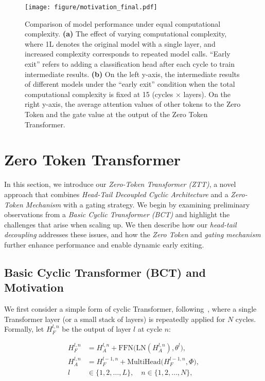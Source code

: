 \begin{figure*}[h]
    \centering
    \texttt{[image: figure/motivation\_final.pdf]}
    \vspace{-0.5cm}
\caption{
Comparison of model performance under equal computational complexity.
\textbf{(a)} The effect of varying computational complexity, where 1L denotes the original model with a single layer, and increased complexity corresponds to repeated model calls.
``Early exit'' refers to adding a classification head after each cycle to train intermediate results.
\textbf{(b)} On the left y-axis, the intermediate results of different models under the ``early exit'' condition when the total computational complexity is fixed at 15 (cycles $\times$ layers).
On the right y-axis, the average attention values of other tokens to the Zero Token and the gate value at the output of the Zero Token Transformer.
}
\label{fig:1}
\vspace{-0.5cm}
\end{figure*}


\section{Zero Token Transformer}
In this section, we introduce our \emph{Zero-Token Transformer (ZTT)}, a novel approach that combines \emph{Head-Tail Decoupled Cyclic Architecture} and a \emph{Zero-Token Mechanism} with a gating strategy.
We begin by examining preliminary observations from a \emph{Basic Cyclic Transformer (BCT)} and highlight the challenges that arise when scaling up.
We then describe how our \emph{head-tail decoupling} addresses these issues, and how the \emph{Zero Token} and \emph{gating mechanism} further enhance performance and enable dynamic early exiting.

\subsection{Basic Cyclic Transformer (BCT) and Motivation}
\label{sec:bct}

We first consider a simple form of cyclic Transformer, following~\cite{bae2024relaxed,takase2021lessons}, where a single Transformer layer (or a small stack of layers) is repeatedly applied for $N$ cycles.
Formally, let $H_F^{l,n}$ be the output of layer $l$ at cycle $n$:

\vspace{-0.5cm}
\begin{equation}
\label{eq:1}
\begin{aligned}  
    H_F^{l,n} &=  H_A^{l,n} + \text{FFN}\bigl(\text{LN}(H_A^{l,n}), \theta^l\bigr),\\
    H_A^{l,n} &= H_F^{l-1,n} + \text{MultiHead}\bigl(H_F^{l-1,n}, \Phi\bigr),\\
    l &\in \{1, 2, \dots, L\}, \quad n \in \{1, 2, \dots, N\},
\end{aligned}
\end{equation}
\vspace{-0.5cm}

